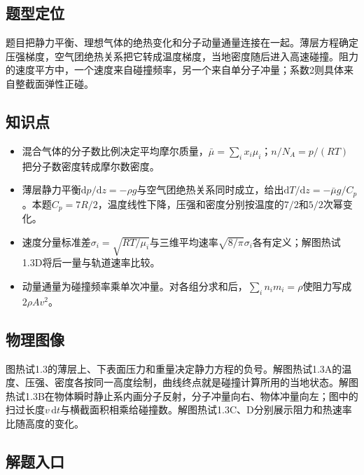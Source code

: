 \documentclass[UTF8,fontset=fandol,a4paper,11pt]{ctexart}
\begin{document}
\subsection*{题型定位}

题目把静力平衡、理想气体的绝热变化和分子动量通量连接在一起。薄层方程确定压强梯度，空气团绝热关系把它转成温度梯度，当地密度随后进入高速碰撞。阻力的速度平方中，一个速度来自碰撞频率，另一个来自单分子冲量；系数2则具体来自整截面弹性正碰。



\subsection*{知识点}

\begin{itemize}
\item 混合气体的分子数比例决定平均摩尔质量，$\bar\mu=\sum_i x_i\mu_i$；$n/N_A=p/(RT)$把分子数密度转成摩尔数密度。
\item 薄层静力平衡$\mathrm dp/\mathrm dz=-\rho g$与空气团绝热关系同时成立，给出$\mathrm dT/\mathrm dz=-\bar\mu g/C_p$。本题$C_p=7R/2$，温度线性下降，压强和密度分别按温度的$7/2$和$5/2$次幂变化。
\item 速度分量标准差$\sigma_i=\sqrt{RT/\mu_i}$与三维平均速率$\sqrt{8/\pi}\sigma_i$各有定义；解图热试1.3D将后一量与轨道速率比较。
\item 动量通量为碰撞频率乘单次冲量。对各组分求和后，$\sum_i n_im_i=\rho$使阻力写成$2\rho Av^2$。
\end{itemize}



\subsection*{物理图像}

图热试1.3的薄层上、下表面压力和重量决定静力方程的负号。解图热试1.3A的温度、压强、密度各按同一高度绘制，曲线终点就是碰撞计算所用的当地状态。解图热试1.3B在物体瞬时静止系内画分子反射，分子冲量向右、物体冲量向左；图中的扫过长度$v\,\mathrm dt$与横截面积相乘给碰撞数。解图热试1.3C、D分别展示阻力和热速率比随高度的变化。



\subsection*{解题入口}
\end{document}
